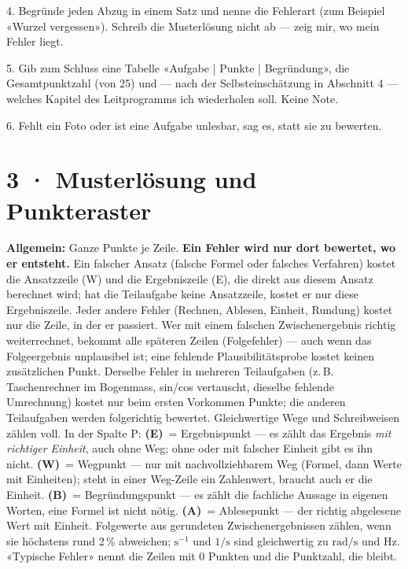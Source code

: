 \documentclass[11pt]{article}
\begin{document}
\begin{tcolorbox}[breakable,colback=lplinie!25,colframe=lplinie,boxrule=0.5pt,arc=1mm,fontupper=\small]
4. Begründe jeden Abzug in einem Satz und nenne die Fehlerart (zum Beispiel «Wurzel vergessen»). Schreib die Musterlösung nicht ab — zeig mir, wo mein Fehler liegt.\par
5. Gib zum Schluss eine Tabelle «Aufgabe | Punkte | Begründung», die Gesamtpunktzahl (von 25) und — nach der Selbsteinschätzung in Abschnitt 4 — welches Kapitel des Leitprogramms ich wiederholen soll. Keine Note.\par
6. Fehlt ein Foto oder ist eine Aufgabe unlesbar, sag es, statt sie zu bewerten.
\end{tcolorbox}

\section*{3 · Musterlösung und Punkteraster}
\textbf{Allgemein:} Ganze Punkte je Zeile. \textbf{Ein Fehler wird nur dort bewertet, wo er entsteht.} Ein falscher Ansatz (falsche
Formel oder falsches Verfahren) kostet die Ansatzzeile (W) und die Ergebniszeile (E), die direkt aus diesem Ansatz berechnet wird;
hat die Teilaufgabe keine Ansatzzeile, kostet er nur diese Ergebniszeile. Jeder andere Fehler (Rechnen, Ablesen, Einheit, Rundung)
kostet nur die Zeile, in der er passiert. Wer mit einem falschen Zwischenergebnis
richtig weiterrechnet, bekommt alle späteren Zeilen (Folgefehler) — auch wenn das Folgeergebnis unplausibel ist; eine fehlende
Plausibilitätsprobe kostet keinen zusätzlichen Punkt. Derselbe Fehler in mehreren Teilaufgaben (z.\,B. Taschenrechner im Bogenmass,
sin/cos vertauscht, dieselbe fehlende Umrechnung) kostet nur beim ersten Vorkommen Punkte; die anderen Teilaufgaben werden
folgerichtig bewertet. Gleichwertige Wege und Schreibweisen zählen voll.
In der Spalte P: \textbf{(E)}~= Ergebnispunkt — es zählt das Ergebnis \emph{mit richtiger Einheit}, auch ohne Weg; ohne oder mit
falscher Einheit gibt es ihn nicht. \textbf{(W)}~= Wegpunkt — nur mit nachvollziehbarem Weg (Formel, dann Werte mit Einheiten);
steht in einer Weg-Zeile ein Zahlenwert, braucht auch er die Einheit. \textbf{(B)}~= Begründungspunkt — es zählt die fachliche
Aussage in eigenen Worten, eine Formel ist nicht nötig. \textbf{(A)}~= Ablesepunkt — der richtig abgelesene Wert mit Einheit.
Folgewerte aus gerundeten Zwischenergebnissen zählen, wenn sie höchstens rund 2\,\% abweichen; $\text{s}^{-1}$ und $1/\text{s}$ sind
gleichwertig zu $\text{rad/s}$ und $\text{Hz}$. «Typische Fehler» nennt die Zeilen mit 0 Punkten und die Punktzahl, die bleibt.
\end{document}

